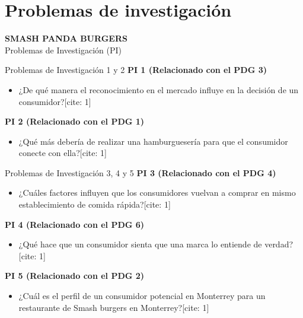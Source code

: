 \section{Problemas de investigación}

\begin{frame}{}
  \vspace{1.5cm}
  \centering
  \Huge \textbf{SMASH PANDA BURGERS} \\
  \vspace{0.5cm}
  \Large Problemas de Investigación (PI)
\end{frame}

\begin{frame}{Problemas de Investigación 1 y 2}
  \vspace{1.5cm}
  \textbf{PI 1 (Relacionado con el PDG 3)}
  \begin{itemize}
    \item ¿De qué manera el reconocimiento en el mercado influye en la decisión de un consumidor?[cite: 1]
  \end{itemize}

  \vspace{0.5cm}
  \textbf{PI 2 (Relacionado con el PDG 1)}
  \begin{itemize}
    \item ¿Qué más debería de realizar una hamburguesería para que el consumidor conecte con ella?[cite: 1]
  \end{itemize}
\end{frame}

\begin{frame}{Problemas de Investigación 3, 4 y 5}
  \vspace{1.5cm}
  \textbf{PI 3 (Relacionado con el PDG 4)}
  \begin{itemize}
    \item ¿Cuáles factores influyen que los consumidores vuelvan a comprar en mismo establecimiento de comida rápida?[cite: 1]
  \end{itemize}

  \vspace{0.3cm}
  \textbf{PI 4 (Relacionado con el PDG 6)}
  \begin{itemize}
    \item ¿Qué hace que un consumidor sienta que una marca lo entiende de verdad?[cite: 1]
  \end{itemize}

  \vspace{0.3cm}
  \textbf{PI 5 (Relacionado con el PDG 2)}
  \begin{itemize}
    \item ¿Cuál es el perfil de un consumidor potencial en Monterrey para un restaurante de Smash burgers en Monterrey?[cite: 1]
  \end{itemize}
\end{frame}
